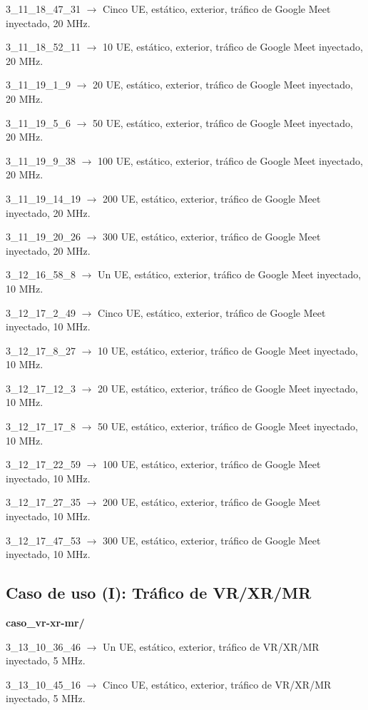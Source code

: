 \documentclass[12pt]{report} %
\begin{document}
3\_11\_18\_47\_31 $\rightarrow$ Cinco UE, estático, exterior, tráfico de Google Meet inyectado, 20 MHz.

3\_11\_18\_52\_11 $\rightarrow$ 10 UE, estático, exterior, tráfico de Google Meet inyectado, 20 MHz.

3\_11\_19\_1\_9 $\rightarrow$ 20 UE, estático, exterior, tráfico de Google Meet inyectado, 20 MHz.

3\_11\_19\_5\_6 $\rightarrow$ 50 UE, estático, exterior, tráfico de Google Meet inyectado, 20 MHz.

3\_11\_19\_9\_38 $\rightarrow$ 100 UE, estático, exterior, tráfico de Google Meet inyectado, 20 MHz.

3\_11\_19\_14\_19 $\rightarrow$ 200 UE, estático, exterior, tráfico de Google Meet inyectado, 20 MHz.

3\_11\_19\_20\_26 $\rightarrow$ 300 UE, estático, exterior, tráfico de Google Meet inyectado, 20 MHz.

3\_12\_16\_58\_8 $\rightarrow$ Un UE, estático, exterior, tráfico de Google Meet inyectado, 10 MHz.

3\_12\_17\_2\_49 $\rightarrow$ Cinco UE, estático, exterior, tráfico de Google Meet inyectado, 10 MHz.

3\_12\_17\_8\_27 $\rightarrow$ 10 UE, estático, exterior, tráfico de Google Meet inyectado, 10 MHz.

3\_12\_17\_12\_3 $\rightarrow$ 20 UE, estático, exterior, tráfico de Google Meet inyectado, 10 MHz.

3\_12\_17\_17\_8 $\rightarrow$ 50 UE, estático, exterior, tráfico de Google Meet inyectado, 10 MHz.

3\_12\_17\_22\_59 $\rightarrow$ 100 UE, estático, exterior, tráfico de Google Meet inyectado, 10 MHz.

3\_12\_17\_27\_35 $\rightarrow$ 200 UE, estático, exterior, tráfico de Google Meet inyectado, 10 MHz.

3\_12\_17\_47\_53 $\rightarrow$ 300 UE, estático, exterior, tráfico de Google Meet inyectado, 10 MHz.

\subsection* {Caso de uso (I): Tráfico de VR/XR/MR}

\textbf{caso\_vr-xr-mr/}

3\_13\_10\_36\_46 $\rightarrow$ Un UE, estático, exterior, tráfico de VR/XR/MR inyectado, 5 MHz.

3\_13\_10\_45\_16 $\rightarrow$ Cinco UE, estático, exterior, tráfico de VR/XR/MR inyectado, 5 MHz.
\end{document}
